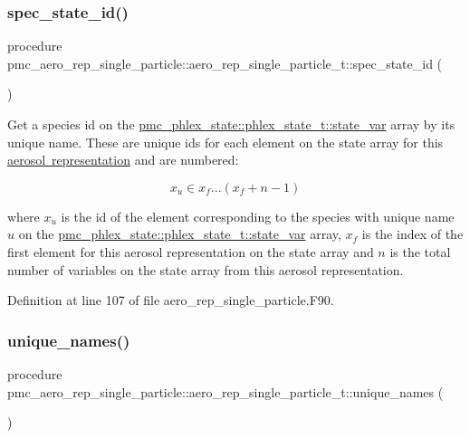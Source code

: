 \subsubsection{\texorpdfstring{spec\+\_\+state\+\_\+id()}{spec\_state\_id()}}
{\footnotesize\ttfamily procedure pmc\+\_\+aero\+\_\+rep\+\_\+single\+\_\+particle\+::aero\+\_\+rep\+\_\+single\+\_\+particle\+\_\+t\+::spec\+\_\+state\+\_\+id (\begin{DoxyParamCaption}{ }\end{DoxyParamCaption})\hspace{0.3cm}{\ttfamily [private]}}



Get a species id on the {\ttfamily \mbox{\hyperlink{structpmc__phlex__state_1_1phlex__state__t_a78835cb552d483ebbfc7a6bc6f756918}{pmc\+\_\+phlex\+\_\+state\+::phlex\+\_\+state\+\_\+t\+::state\+\_\+var}}} array by its unique name. These are unique ids for each element on the state array for this \mbox{\hyperlink{phlex_aero_rep}{aerosol representation}} and are numbered\+: 

\[x_u \in x_f ... (x_f+n-1)\]

where $x_u$ is the id of the element corresponding to the species with unique name $u$ on the {\ttfamily \mbox{\hyperlink{structpmc__phlex__state_1_1phlex__state__t_a78835cb552d483ebbfc7a6bc6f756918}{pmc\+\_\+phlex\+\_\+state\+::phlex\+\_\+state\+\_\+t\+::state\+\_\+var}}} array, $x_f$ is the index of the first element for this aerosol representation on the state array and $n$ is the total number of variables on the state array from this aerosol representation. 

Definition at line 107 of file aero\+\_\+rep\+\_\+single\+\_\+particle.\+F90.

\mbox{\label{structpmc__aero__rep__single__particle_1_1aero__rep__single__particle__t_aa8ec2b6a9bef271eba50a3a048a90ac8}} 
\subsubsection{\texorpdfstring{unique\+\_\+names()}{unique\_names()}}
{\footnotesize\ttfamily procedure pmc\+\_\+aero\+\_\+rep\+\_\+single\+\_\+particle\+::aero\+\_\+rep\+\_\+single\+\_\+particle\+\_\+t\+::unique\+\_\+names (\begin{DoxyParamCaption}{ }\end{DoxyParamCaption})\hspace{0.3cm}{\ttfamily [private]}}



